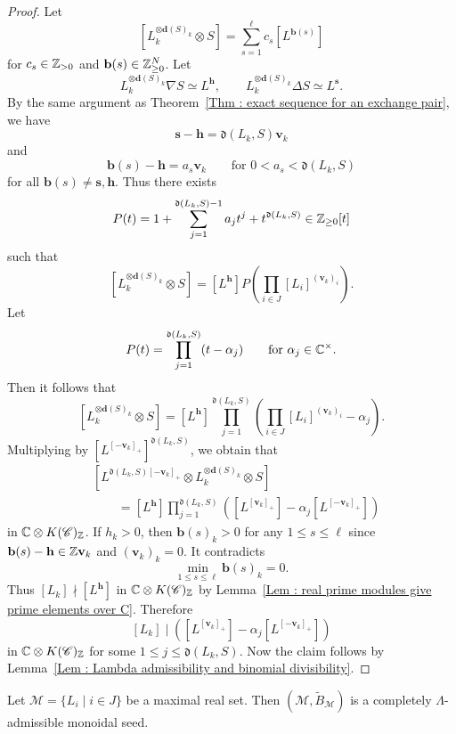 \begin{proof}
Let
\[
[L_k^{\otimes\mathbf{d}(S)_k} \otimes S]
= \sum_{s=1}^{\ell}c_s[L^{\mathbf{b}(s)}]
\]
for $c_s \in \mathbb{Z}_{>0}$ and $\mathbf{b}(s) \in \mathbb{Z}_{\geq 0}^N$.
Let
\[
L_k^{\otimes\mathbf{d}(S)_k} \nabla S \simeq L^{\mathbf{h}},
\qquad
L_k^{\otimes\mathbf{d}(S)_k} \Delta S \simeq L^{\mathbf{s}}.
\]
By the same argument as
Theorem~\ref{Thm : exact sequence for an exchange pair}, we have
\[
\mathbf{s} - \mathbf{h}
= \mathfrak{d}(L_k, S)\mathbf{v}_k
\]
and
\[
\mathbf{b}(s) - \mathbf{h} = a_s\mathbf{v}_k
\qquad\text{for }0 < a_s < \mathfrak{d}(L_k, S)
\]
for all $\mathbf{b}(s) \neq \mathbf{s}, \mathbf{h}$.
Thus there exists
\[
P(t) = 1 + \sum_{j=1}^{\mathfrak{d}(L_k, S)-1}a_jt^j
+ t^{\mathfrak{d}(L_k, S)} \in \mathbb{Z}_{\geq 0}[t]
\]
such that
\[
[L_k^{\otimes\mathbf{d}(S)_k} \otimes S]
= [L^{\mathbf{h}}]
P\left(\prod_{i \in J}[L_i]^{(\mathbf{v}_k)_i}\right).
\]
Let
\[
P(t) = \prod_{j=1}^{\mathfrak{d}(L_k, S)}(t - \alpha_j)
\qquad\text{for }\alpha_j \in \mathbb{C}^{\times}.
\]
Then it follows that
\[
[L_k^{\otimes\mathbf{d}(S)_k} \otimes S]
= [L^{\mathbf{h}}]
\prod_{j=1}^{\mathfrak{d}(L_k, S)}
\left(\prod_{i \in J}[L_i]^{(\mathbf{v}_k)_i} - \alpha_j\right).
\]
Multiplying by $[L^{[-\mathbf{v}_k]_+}]^{\mathfrak{d}(L_k, S)}$,
we obtain that
\[
\begin{aligned}
&[L^{\mathfrak{d}(L_k, S)[-\mathbf{v}_k]_+}
\otimes L_k^{\otimes\mathbf{d}(S)_k} \otimes S] \\
&\qquad = [L^{\mathbf{h}}]
\prod_{j=1}^{\mathfrak{d}(L_k, S)}
\left([L^{[\mathbf{v}_k]_+}]
- \alpha_j[L^{[-\mathbf{v}_k]_+}]\right)
\end{aligned}
\]
in $\mathbb{C} \otimes K(\mathscr{C})_{\mathbb{Z}}$.
If $h_k > 0$, then $\mathbf{b}(s)_k > 0$ for any
$1 \leq s \leq \ell$ since
$\mathbf{b}(s) - \mathbf{h} \in \mathbb{Z}\mathbf{v}_k$
and $(\mathbf{v}_k)_k = 0$.
It contradicts
\[
\min_{1 \leq s \leq \ell}\mathbf{b}(s)_k = 0.
\]
Thus $[L_k] \nmid [L^{\mathbf{h}}]$ in
$\mathbb{C} \otimes K(\mathscr{C})_{\mathbb{Z}}$ by
Lemma~\ref{Lem : real prime modules give prime elements over C}.
Therefore
\[
[L_k] \mid
\left([L^{[\mathbf{v}_k]_+}]
- \alpha_j[L^{[-\mathbf{v}_k]_+}]\right)
\]
in $\mathbb{C} \otimes K(\mathscr{C})_{\mathbb{Z}}$ for some
$1 \leq j \leq \mathfrak{d}(L_k, S)$.
Now the claim follows by
Lemma~\ref{Lem : Lambda admissibility and binomial divisibility}.
\end{proof}

\begin{Cor}
\label{Cor : complete Lambda admissibility of maximal real sets}
Let $\mathcal{M} = \{L_i \mid i \in J\}$ be a maximal real set.
Then $(\mathcal{M}, \widetilde{B}_{\mathcal{M}})$ is a completely
$\Lambda$-admissible monoidal seed.
\end{Cor}

